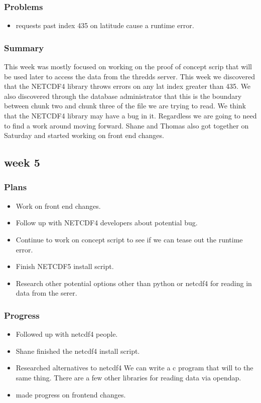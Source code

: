 \documentclass[onecolumn, draftclsnofoot,10pt, compsoc]{article}
\begin{document}
			\subsubsection{Problems}
				\begin{itemize}
					\item requests past index 435 on latitude cause a runtime error.
				\end{itemize}
			\subsubsection{Summary}
			This week was mostly focused on working on the proof of concept scrip that will be used later to access the data from the thredds server. This week we discovered that the NETCDF4 library throws errors on any lat index greater than 435. We also discovered through the database administrator that this is the boundary between chunk two and chunk three of the file we are trying to read. We think that the NETCDF4 library may have a bug in it. Regardless we are going to need to find a work around moving forward. Shane and Thomas also got together on Saturday and started working on front end changes.\\

		\subsection{week 5}
			\subsubsection{Plans}
				\begin{itemize}
					\item Work on front end changes.
					\item Follow up with NETCDF4 developers about potential bug.
					\item Continue to work on concept script to see if we can tease out the runtime error.
					\item Finish NETCDF5 install script.
					\item Research other potential options other than python or netcdf4 for reading in data from the serer.\\

				\end{itemize}
			\subsubsection{Progress}
				\begin{itemize}
					\item Followed up with netcdf4 people.
					\item Shane finished the netcdf4 install script.
					\item Researched alternatives to netcdf4 We can write a c program that will to the same thing. There are a few other libraries for reading data via opendap.
					\item made progress on frontend changes.
				\end{itemize}
\end{document}
